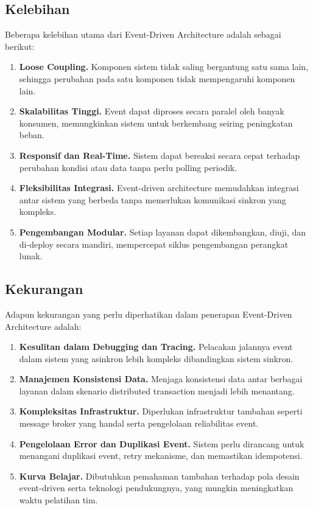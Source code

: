 \subsection{Kelebihan}
Beberapa kelebihan utama dari Event-Driven Architecture adalah sebagai berikut:
\begin{enumerate}
	\item \textbf{Loose Coupling.} Komponen sistem tidak saling bergantung satu sama lain, sehingga perubahan pada satu komponen tidak mempengaruhi komponen lain.
	\item \textbf{Skalabilitas Tinggi.} Event dapat diproses secara paralel oleh banyak konsumen, memungkinkan sistem untuk berkembang seiring peningkatan beban.
	\item \textbf{Responsif dan Real-Time.} Sistem dapat bereaksi secara cepat terhadap perubahan kondisi atau data tanpa perlu polling periodik.
	\item \textbf{Fleksibilitas Integrasi.} Event-driven architecture memudahkan integrasi antar sistem yang berbeda tanpa memerlukan komunikasi sinkron yang kompleks.
	\item \textbf{Pengembangan Modular.} Setiap layanan dapat dikembangkan, diuji, dan di-deploy secara mandiri, mempercepat siklus pengembangan perangkat lunak.
\end{enumerate}

\subsection{Kekurangan}
Adapun kekurangan yang perlu diperhatikan dalam penerapan Event-Driven Architecture adalah:
\begin{enumerate}
	\item \textbf{Kesulitan dalam Debugging dan Tracing.} Pelacakan jalannya event dalam sistem yang asinkron lebih kompleks dibandingkan sistem sinkron.
	\item \textbf{Manajemen Konsistensi Data.} Menjaga konsistensi data antar berbagai layanan dalam skenario distributed transaction menjadi lebih menantang.
	\item \textbf{Kompleksitas Infrastruktur.} Diperlukan infrastruktur tambahan seperti message broker yang handal serta pengelolaan reliabilitas event.
	\item \textbf{Pengelolaan Error dan Duplikasi Event.} Sistem perlu dirancang untuk menangani duplikasi event, retry mekanisme, dan memastikan idempotensi.
	\item \textbf{Kurva Belajar.} Dibutuhkan pemahaman tambahan terhadap pola desain event-driven serta teknologi pendukungnya, yang mungkin meningkatkan waktu pelatihan tim.
\end{enumerate}

